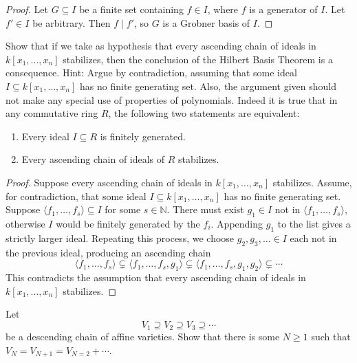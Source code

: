 \begin{proof}
    Let $G \subseteq I$ be a finite set containing $f \in I$, where     
        $f$ is a generator of $I$.
    Let $f' \in I$ be arbitrary. Then $f \mid f'$,
        so $G$ is a Grobner basis of $I$.
\end{proof}


\begin{tcolorbox}[title=Problem 12, breakable]
    Show that if we take as hypothesis that 
    every ascending chain of ideals in $k[x_1, \ldots, x_n]$
    stabilizes, then the conclusion of the Hilbert Basis 
    Theorem is a consequence. Hint: Argue by contradiction,
    assuming that some ideal $I \subseteq k[x_1, \ldots, x_n]$
    has no finite generating set. Also, the argument
    given should not make any special use of properties 
    of polynomials. Indeed it is true that 
    in any commutative ring $R$, the following two 
    statements are equivalent:
    \begin{enumerate}
        \item Every ideal $I \subseteq R$ is finitely generated.
        \item Every ascending chain of ideals of $R$ stabilizes.
    \end{enumerate}
\end{tcolorbox}

\begin{proof}
    Suppose every ascending chain of ideals in $k[x_1, \ldots, x_n]$ stabilizes.
    Assume, for contradiction, that some ideal $I \subseteq k[x_1, \ldots, x_n]$ 
        has no finite generating set.
    Suppose $\langle f_1, \ldots, f_s \rangle \subseteq I$ for some $s \in \mathbb{N}$.
    There must exist $g_1 \in I$ not in $\langle f_1, \ldots, f_s \rangle$, 
        otherwise $I$ would be finitely generated by the $f_i$. 
    Appending $g_1$ to the list gives a strictly larger ideal.
    Repeating this process, we choose $g_2, g_3, \dots \in I$ 
        each not in the previous ideal, producing an ascending chain
    \[
        \langle f_1, \ldots, f_s \rangle \subsetneq 
        \langle f_1, \ldots, f_s, g_1 \rangle \subsetneq 
        \langle f_1, \ldots, f_s, g_1, g_2 \rangle \subsetneq \cdots
    \]
    This contradicts the assumption that every ascending chain of ideals in 
        $k[x_1, \ldots, x_n]$ stabilizes.
\end{proof}

\begin{tcolorbox}[title=Problem 13, breakable]
    Let
    \[V_1 \supseteq V_2 \supseteq V_3 \supseteq \cdots\]
    be a descending chain of affine varieties. Show 
    that there is some $N \ge 1$ such that
    $V_N = V_{N + 1} = V_{N = 2} + \cdots$.
\end{tcolorbox}


